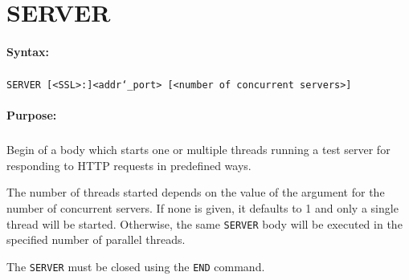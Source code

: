 
\newpage
\section{SERVER}
\label{cmd:SERVER}

\paragraph{Syntax:}
\subparagraph{}
\texttt{SERVER [<SSL>:]<addr\char`\_port> [<number of concurrent servers>]}

\paragraph{Purpose:}
\subparagraph{}
Begin of a body which starts one or multiple threads running a test server for responding  
to HTTP requests in predefined ways.

The number of threads started depends on the value of the argument for 
the number of concurrent servers. If none is given, it defaults to 1 and 
only a single thread will be started. Otherwise, the same \texttt{SERVER} body will 
be executed in the specified number of parallel threads.

The \texttt{SERVER} must be closed using the \texttt{END} command.

